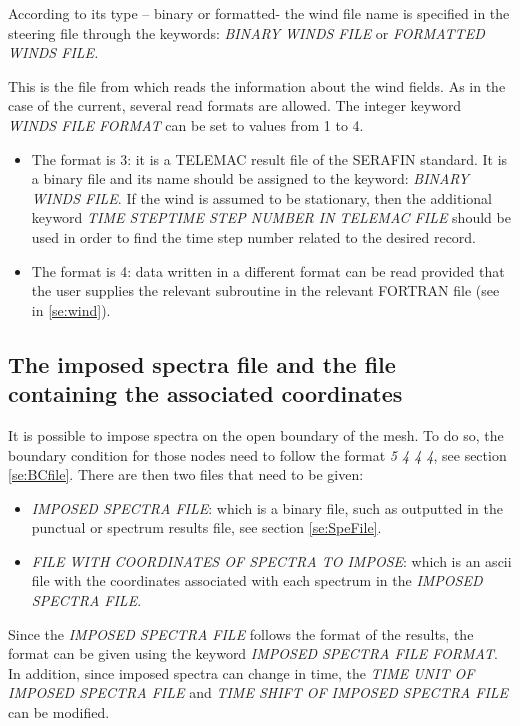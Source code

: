  According to its type -- binary or formatted- the wind file name is specified in the steering file through the keywords: \textit{BINARY WINDS FILE }or\textit{ FORMATTED WINDS FILE.}

 This is the file from which \tomawac reads the information about the wind fields. As in the case of the current, several read formats are allowed. The integer keyword \textit{WINDS FILE FORMAT} can be set to values from 1 to 4.

\begin{itemize}
\item  The format is 3: it is a TELEMAC result file of the SERAFIN standard. It is a binary file and its name should be assigned to the keyword: \textit{BINARY WINDS FILE}. If the wind is assumed to be stationary, then the additional keyword \textit{TIME STEPTIME STEP NUMBER IN TELEMAC FILE }should be used in order to find the time step number related to the desired record.
\item  The format is 4: data written in a different format can be read provided that the user supplies the relevant subroutine in the relevant FORTRAN file (see in \ref{se:wind}).
\end{itemize}

\subsection{ The imposed spectra file and the file containing the associated coordinates}
\label{se:ImpSpeCoorFiles}

It is possible to impose spectra on the open boundary of the mesh. To do so, the boundary condition for those nodes
need to follow the format \textit{5 4 4 4}, see section \ref{se:BCfile}. There are then two files that need to be 
given:

\begin{itemize}
\item \textit{IMPOSED SPECTRA FILE}: which is a binary file, such as outputted in the punctual or spectrum
results file, see section \ref{se:SpeFile}.

\item \textit{FILE WITH COORDINATES OF SPECTRA TO IMPOSE}: which is an ascii file with the coordinates associated
with each spectrum in the \textit{IMPOSED SPECTRA FILE}.
\end{itemize}

Since the \textit{IMPOSED SPECTRA FILE} follows the format of the \telemacsystem{} results, the format can be given using
the keyword \textit{IMPOSED SPECTRA FILE FORMAT}. In addition, since imposed spectra can change in time, the
\textit{TIME UNIT OF IMPOSED SPECTRA FILE} and \textit{TIME SHIFT OF IMPOSED SPECTRA FILE} can be modified.

